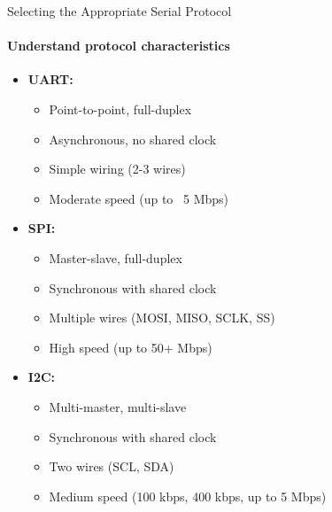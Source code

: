 \begin{KR}{Selecting the Appropriate Serial Protocol}\\
\paragraph{Understand protocol characteristics}
\begin{itemize}
    \item \textbf{UART:}
    \begin{itemize}
        \item Point-to-point, full-duplex
        \item Asynchronous, no shared clock
        \item Simple wiring (2-3 wires)
        \item Moderate speed (up to ~5 Mbps)
    \end{itemize}
    \item \textbf{SPI:}
    \begin{itemize}
        \item Master-slave, full-duplex
        \item Synchronous with shared clock
        \item Multiple wires (MOSI, MISO, SCLK, SS)
        \item High speed (up to 50+ Mbps)
    \end{itemize}
    \item \textbf{I2C:}
    \begin{itemize}
        \item Multi-master, multi-slave
        \item Synchronous with shared clock
        \item Two wires (SCL, SDA)
        \item Medium speed (100 kbps, 400 kbps, up to 5 Mbps)
    \end{itemize}
\end{itemize}


\end{KR}
